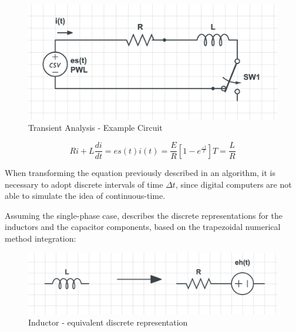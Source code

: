 \begin{figure}[H]
  \caption{Transient Analysis - Example Circuit}
  \centering
  \begin{minipage}[c]{0.59\linewidth}  
    \includegraphics[width=1\linewidth]{img/transient1.png}
  \end{minipage}
  \hfill
  \begin{minipage}[c]{0.3\linewidth}
  \end{minipage}  
  \label{transient1}
\end{figure}


\begin{subequations}
  \begin{equation}
    Ri + L \frac{di}{dt} = es(t)
  \end{equation}
  \begin{equation}
    i(t) = \frac{E}{R}[1 - e^{\frac{-t}{T}}]
  \end{equation}
  \begin{equation}
    T = \frac{L}{R}
  \end{equation}
\end{subequations}


When transforming the equation previously described in an algorithm, it is necessary to adopt discrete intervals of time $ \Delta t $, since digital computers are not able to simulate the idea of continuous-time. 

Assuming the single-phase case, \cite{dommel1969digital} describes the discrete representations for the inductors and the capacitor components, based on the trapezoidal numerical method integration:


\begin{figure}[H]
  \caption{Inductor - equivalent discrete representation}
  \centering
  \begin{minipage}[c]{0.59\linewidth}  
    \includegraphics[width=1\linewidth]{img/Lequiv.png}
  \end{minipage}
  \hfill
  \begin{minipage}[c]{0.3\linewidth}
    
  \end{minipage}  
  \label{transient2}
\end{figure}

